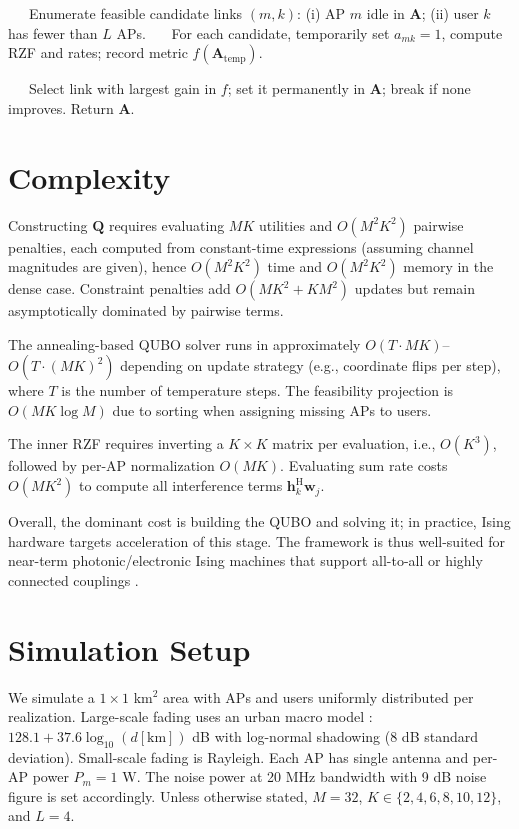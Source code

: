 {\begin{algorithm}[htbp]
\begin{algorithmic}[1]
\State ~~~Enumerate feasible candidate links $(m,k)$: (i) AP $m$ idle in $\mathbf{A}$; (ii) user $k$ has fewer than $L$ APs.
\State ~~~For each candidate, temporarily set $a_{mk}\!=\!1$, compute RZF and rates; record metric $f(\mathbf{A}_{\text{temp}})$.

\State ~~~Select link with largest gain in $f$; set it permanently in $\mathbf{A}$; break if none improves.
\State Return $\mathbf{A}$.
\end{algorithmic}
\end{algorithm}

\section{Complexity}
Constructing $\mathbf{Q}$ requires evaluating $MK$ utilities and $O(M^2K^2)$ pairwise penalties, each computed from constant-time expressions (assuming channel magnitudes are given), hence $O(M^2K^2)$ time and $O(M^2K^2)$ memory in the dense case. Constraint penalties add $O(MK^2+KM^2)$ updates but remain asymptotically dominated by pairwise terms.

The annealing-based QUBO solver runs in approximately $O(T\cdot MK)$–$O(T\cdot (MK)^2)$ depending on update strategy (e.g., coordinate flips per step), where $T$ is the number of temperature steps. The feasibility projection is $O(MK\log M)$ due to sorting when assigning missing APs to users.

The inner RZF requires inverting a $K\times K$ matrix per evaluation, i.e., $O(K^3)$, followed by per-AP normalization $O(MK)$. Evaluating sum rate costs $O(MK^2)$ to compute all interference terms $\mathbf{h}_k^\mathrm{H}\mathbf{w}_j$.

Overall, the dominant cost is building the QUBO and solving it; in practice, Ising hardware targets acceleration of this stage. The framework is thus well-suited for near-term photonic/electronic Ising machines that support all-to-all or highly connected couplings \cite{mcmahon2016fully,inagaki2016coherent}.

\section{Simulation Setup}
We simulate a $1\times 1$ km$^2$ area with APs and users uniformly distributed per realization. Large-scale fading uses an urban macro model \cite{bjornson2016massive}: $128.1+37.6\log_{10}(d[\mathrm{km}])$ dB with log-normal shadowing (8 dB standard deviation). Small-scale fading is Rayleigh. Each AP has single antenna and per-AP power $P_m=1$ W. The noise power at 20 MHz bandwidth with 9 dB noise figure is set accordingly. Unless otherwise stated, $M=32$, $K\in\{2,4,6,8,10,12\}$, and $L=4$.

}
